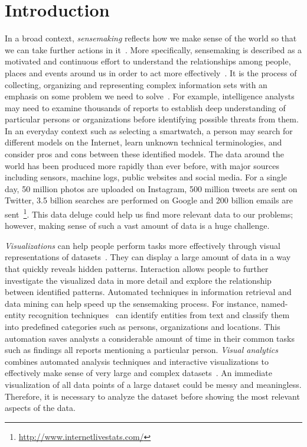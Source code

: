 \chapter{Introduction}
\label{chap:intro}

\graphicspath{{Chapter1/figures/}}

In a broad context, \emph{sensemaking} reflects how we make sense of the world so that we can take further actions in it~\cite{Snowden2005}. More specifically, sensemaking is described as a motivated and continuous effort to understand the relationships among people, places and events around us in order to act more effectively~\cite{Klein2006a}. It is the process of collecting, organizing and representing complex information sets with an emphasis on some problem we need to solve~\cite{Russell2008}. For example, intelligence analysts may need to examine thousands of reports to establish deep understanding of particular persons or organizations before identifying possible threats from them. In an everyday context such as selecting a smartwatch, a person may search for different models on the Internet, learn unknown technical terminologies, and consider pros and cons between these identified models. The data around the world has been produced more rapidly than ever before, with major sources including sensors, machine logs, public websites and social media. For a single day, 50 million photos are uploaded on Instagram, 500 million tweets are sent on Twitter, 3.5 billion searches are performed on Google and 200 billion emails are sent~\footnote{\url{http://www.internetlivestats.com/}}. This data deluge could help us find more relevant data to our problems; however, making sense of such a vast amount of data is a huge challenge.

\emph{Visualizations} can help people perform tasks more effectively through visual representations of datasets~\cite{Munzner2014}. They can display a large amount of data in a way that quickly reveals hidden patterns. Interaction allows people to further investigate the visualized data in more detail and explore the relationship between identified patterns. Automated techniques in information retrieval and data mining can help speed up the sensemaking process. For instance, named-entity recognition techniques~\cite{Nadeau2007} can identify entities from text and classify them into predefined categories such as persons, organizations and locations. This automation saves analysts a considerable amount of time in their common tasks such as findings all reports mentioning a particular person. \emph{Visual analytics} combines automated analysis techniques and interactive visualizations to effectively make sense of very large and complex datasets~\cite{Keim2010}. An immediate visualization of all data points of a large dataset could be messy and meaningless. Therefore, it is necessary to analyze the dataset before showing the most relevant aspects of the data.

